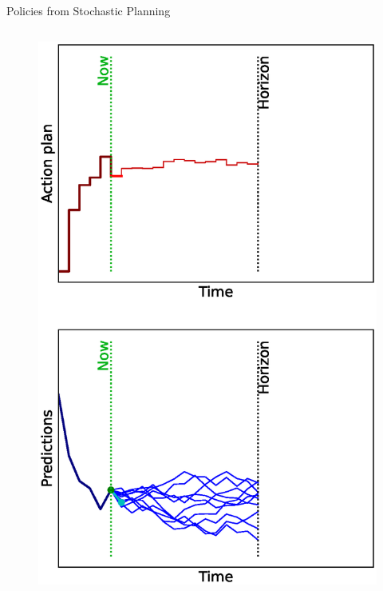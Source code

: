\documentclass[lecture]{beamer}
\begin{document}
\begin{frame}{\normalsize Policies from Stochastic Planning}
\begin{columns}
\begin{overlayarea}{\textwidth}{0.9\textheight}
\begin{figure}
{          \includegraphics[width=\FS\textwidth,clip]{Codes/MPC/MPCMC5.eps}
        }%
        {%
}
\end{figure}
\end{overlayarea}
\end{columns}
\end{frame}
\end{document}

